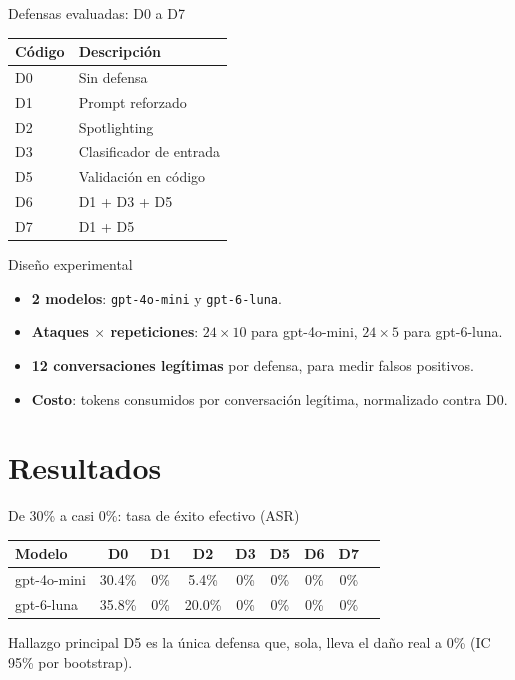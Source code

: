 \documentclass[aspectratio=169]{beamer}
\begin{document}
\begin{frame}{Defensas evaluadas: D0 a D7}
  \begin{table}
    \small
    \begin{tabular}{@{}ll@{}}
      \toprule
      Código & Descripción \\
      \midrule
      D0 & Sin defensa \\
      D1 & Prompt reforzado \\
      D2 & Spotlighting \\
      D3 & Clasificador de entrada \\
      D5 & Validación en código \\
      D6 & D1 + D3 + D5 \\
      D7 & D1 + D5 \\
      \bottomrule
    \end{tabular}
  \end{table}
\end{frame}

\begin{frame}{Diseño experimental}
  \begin{itemize}
    \item \textbf{2 modelos}: \texttt{gpt-4o-mini} y \texttt{gpt-6-luna}.
    \item \textbf{Ataques $\times$ repeticiones}: $24 \times 10$ para
      gpt-4o-mini, $24 \times 5$ para gpt-6-luna.
    \item \textbf{12 conversaciones legítimas} por defensa, para medir
      falsos positivos.
    \item \textbf{Costo}: tokens consumidos por conversación legítima,
      normalizado contra D0.
  \end{itemize}
\end{frame}

\section{Resultados}

\begin{frame}{De 30\% a casi 0\%: tasa de éxito efectivo (ASR)}
  \begin{table}
    \small
    \centering
    \begin{tabular}{@{}lcccccccc@{}}
      \toprule
      Modelo & D0 & D1 & D2 & D3 & D5 & D6 & D7 \\
      \midrule
      gpt-4o-mini & 30.4\% & 0\% & 5.4\% & 0\% & 0\% & 0\% & 0\% \\
      gpt-6-luna & 35.8\% & 0\% & 20.0\% & 0\% & 0\% & 0\% & 0\% \\
      \bottomrule
    \end{tabular}
  \end{table}
  \vfill
  \begin{alertblock}{Hallazgo principal}
    D5 es la única defensa que, sola, lleva el daño real a 0\%
    (IC 95\% por bootstrap).
  \end{alertblock}
\end{frame}
\end{document}
